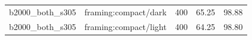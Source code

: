\begin{longtable}{l>{\raggedright\arraybackslash}p{.42\linewidth}rrr}
b2000\_\allowbreak{}both\_\allowbreak{}s305 & %
framing:compact/dark & %
400 & %
65.25 & %
98.88 \\ %

b2000\_\allowbreak{}both\_\allowbreak{}s305 & %
framing:compact/light & %
400 & %
64.25 & %
98.80 \\ %


\end{longtable}
